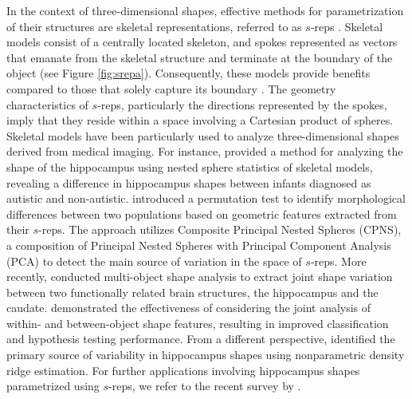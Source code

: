 \documentclass[oneside,11pt]{article}
\begin{document}
%
In the context of three-dimensional shapes, effective methods for parametrization of their structures are skeletal representations, referred to as $s$-reps \citep{Pizer2013}. Skeletal models consist of a centrally located skeleton, and spokes represented as vectors that emanate from the skeletal structure and terminate at the boundary of the object (see Figure \ref{fig:srepa}). Consequently, these models provide benefits compared to those that solely capture its boundary \citep[see, e.g.,][]{liu2021fitting}. The geometry characteristics of $s$-reps, particularly the directions represented by the spokes, imply that they reside within a space involving a Cartesian product of spheres. Skeletal models have been particularly used to analyze three-dimensional shapes derived from medical imaging. For instance, \cite{Pizer2013} provided a method for analyzing the shape of the hippocampus using nested sphere statistics of skeletal models, revealing a difference in hippocampus shapes between infants diagnosed as autistic and non-autistic. \cite{schulz2016non} introduced a permutation test to identify morphological differences between two populations based on geometric features extracted from their $s$-reps. The approach utilizes Composite Principal Nested Spheres (CPNS), a composition of Principal Nested Spheres \citep[PNS;][]{Jung2012} with Principal Component Analysis (PCA) to detect the main source of variation in the space of $s$-reps. More recently, \cite{liu2023analysis} conducted multi-object shape analysis to extract joint shape variation between two functionally related brain structures, the hippocampus and the caudate. \cite{liu2023geometric} demonstrated the effectiveness of considering the joint analysis of within- and between-object shape features, resulting in improved classification and hypothesis testing performance. From a different perspective, \cite{Garcia-Portugues2023} identified the primary source of variability in hippocampus shapes using nonparametric density ridge estimation. For further applications involving hippocampus shapes parametrized using $s$-reps, we refer to the recent survey by \cite{piezer2022skeletons}.
\end{document}
